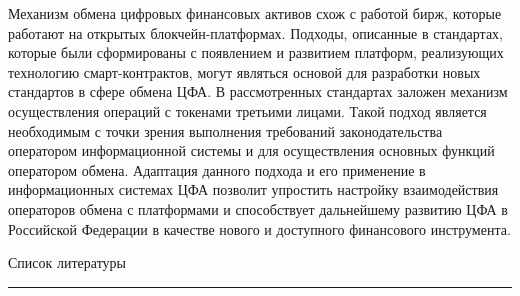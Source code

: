 \documentclass[a4paper, 10pt]{article}
\begin{document}
	Механизм обмена цифровых финансовых активов схож с работой бирж, которые работают на открытых блокчейн-платформах. Подходы, описанные в стандартах, которые были сформированы с появлением и развитием платформ, реализующих технологию смарт-контрактов, могут являться основой для разработки новых стандартов в сфере обмена ЦФА. В рассмотренных стандартах заложен механизм осуществления операций с токенами третьими лицами. Такой подход является необходимым с точки зрения выполнения требований законодательства оператором информационной системы и для осуществления основных функций оператором обмена. Адаптация данного подхода и его применение в информационных системах ЦФА позволит упростить настройку взаимодействия операторов обмена с платформами и способствует дальнейшему развитию ЦФА в Российской Федерации в качестве нового и доступного финансового инструмента.
	\newline
	
	Список литературы
	\hrule height 2pt
	
	
	
\end{document}
